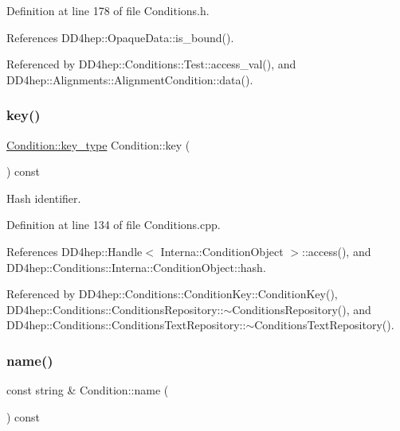 Definition at line 178 of file Conditions.\+h.



References D\+D4hep\+::\+Opaque\+Data\+::is\+\_\+bound().



Referenced by D\+D4hep\+::\+Conditions\+::\+Test\+::access\+\_\+val(), and D\+D4hep\+::\+Alignments\+::\+Alignment\+Condition\+::data().

\hypertarget{class_d_d4hep_1_1_conditions_1_1_condition_ac92d0b4c0533bf46b8ae905455a718e7}{}\label{class_d_d4hep_1_1_conditions_1_1_condition_ac92d0b4c0533bf46b8ae905455a718e7} 
\subsubsection{\texorpdfstring{key()}{key()}}
{\footnotesize\ttfamily \hyperlink{class_d_d4hep_1_1_conditions_1_1_condition_a7528efa762e8cc072ef80ea67c3531f9}{Condition\+::key\+\_\+type} Condition\+::key (\begin{DoxyParamCaption}{ }\end{DoxyParamCaption}) const}



Hash identifier. 



Definition at line 134 of file Conditions.\+cpp.



References D\+D4hep\+::\+Handle$<$ Interna\+::\+Condition\+Object $>$\+::access(), and D\+D4hep\+::\+Conditions\+::\+Interna\+::\+Condition\+Object\+::hash.



Referenced by D\+D4hep\+::\+Conditions\+::\+Condition\+Key\+::\+Condition\+Key(), D\+D4hep\+::\+Conditions\+::\+Conditions\+Repository\+::$\sim$\+Conditions\+Repository(), and D\+D4hep\+::\+Conditions\+::\+Conditions\+Text\+Repository\+::$\sim$\+Conditions\+Text\+Repository().

\hypertarget{class_d_d4hep_1_1_conditions_1_1_condition_ac4ff098ddb6634b752b93e6acddc23c8}{}\label{class_d_d4hep_1_1_conditions_1_1_condition_ac4ff098ddb6634b752b93e6acddc23c8} 
\subsubsection{\texorpdfstring{name()}{name()}}
{\footnotesize\ttfamily const string \& Condition\+::name (\begin{DoxyParamCaption}{ }\end{DoxyParamCaption}) const}



